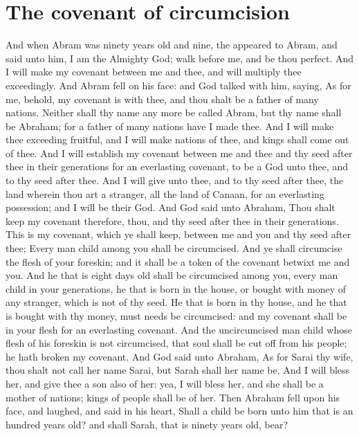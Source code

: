 \section*{The covenant of circumcision}
\begin{biblechapter} %
\verse And when Abram was ninety years old and nine, the \LORD appeared to Abram, and said unto him, I am the Almighty God; walk before me, and be thou perfect.
\verse And I will make my covenant between me and thee, and will multiply thee exceedingly.
\verse And Abram fell on his face: and God talked with him, saying,
\verse As for me, behold, my covenant is with thee, and thou shalt be a father of many nations.
\verse Neither shall thy name any more be called Abram, but thy name shall be Abraham; for a father of many nations have I made thee.
\verse And I will make thee exceeding fruitful, and I will make nations of thee, and kings shall come out of thee.
\verse And I will establish my covenant between me and thee and thy seed after thee in their generations for an everlasting covenant, to be a God unto thee, and to thy seed after thee.
\verse And I will give unto thee, and to thy seed after thee, the land wherein thou art a stranger, all the land of Canaan, for an everlasting possession; and I will be their God.
\verse And God said unto Abraham, Thou shalt keep my covenant therefore, thou, and thy seed after thee in their generations.
\verse This is my covenant, which ye shall keep, between me and you and thy seed after thee; Every man child among you shall be circumcised.
\verse And ye shall circumcise the flesh of your foreskin; and it shall be a token of the covenant betwixt me and you.
\verse And he that is eight days old shall be circumcised among you, every man child in your generations, he that is born in the house, or bought with money of any stranger, which is not of thy seed.
\verse He that is born in thy house, and he that is bought with thy money, must needs be circumcised: and my covenant shall be in your flesh for an everlasting covenant.
\verse And the uncircumcised man child whose flesh of his foreskin is not circumcised, that soul shall be cut off from his people; he hath broken my covenant.
\verse And God said unto Abraham, As for Sarai thy wife, thou shalt not call her name Sarai, but Sarah shall her name be.
\verse And I will bless her, and give thee a son also of her: yea, I will bless her, and she shall be a mother of nations; kings of people shall be of her.
\verse Then Abraham fell upon his face, and laughed, and said in his heart, Shall a child be born unto him that is an hundred years old? and shall Sarah, that is ninety years old, bear?

\end{biblechapter}
